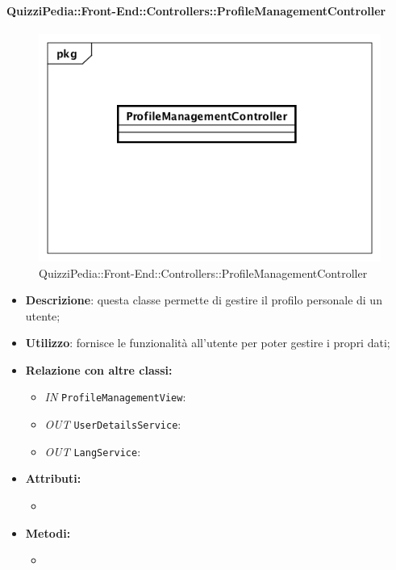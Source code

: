 \paragraph{QuizziPedia::Front-End::Controllers::ProfileManagementController}
\begin{figure}
	\centering
	\includegraphics[scale=0.45]{UML/Classi/Front-End/QuizziPedia_Front-end_Controller_ProfileManagementController.png}
	\caption{QuizziPedia::Front-End::Controllers::ProfileManagementController}
\end{figure}
\begin{itemize}
	\item \textbf{Descrizione}: questa classe permette di gestire il profilo personale di un utente; 
	\item \textbf{Utilizzo}: fornisce le funzionalità all'utente per poter gestire i propri dati;
	\item \textbf{Relazione con altre classi:}
	\begin{itemize}
		\item \textit{IN} \texttt{ProfileManagementView}:  
		\item \textit{OUT} \texttt{UserDetailsService}: 
		\item \textit{OUT} \texttt{LangService}: 
	\end{itemize}
	\item \textbf{Attributi:}
	\begin{itemize}
		\item 
	\end{itemize}
	\item \textbf{Metodi:}
	\begin{itemize}
		\item 
	\end{itemize}
\end{itemize}

